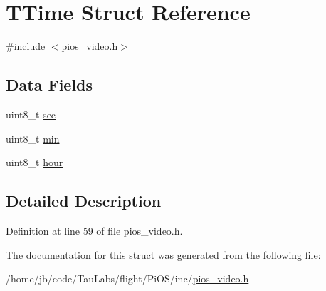 \hypertarget{struct_t_time}{\section{\-T\-Time \-Struct \-Reference}
\label{struct_t_time}
}


{\ttfamily \#include $<$pios\-\_\-video.\-h$>$}

\subsection*{\-Data \-Fields}
\begin{DoxyCompactItemize}
\item 
uint8\-\_\-t \hyperlink{group___p_i_o_s___v_i_d_e_o_gaa6288943af354a6cb143f2ad677cfece}{sec}
\item 
uint8\-\_\-t \hyperlink{group___p_i_o_s___v_i_d_e_o_gadb9b0440ee5ef05786949736913ce45c}{min}
\item 
uint8\-\_\-t \hyperlink{group___p_i_o_s___v_i_d_e_o_gae7afd210e593b007611ac237bd32d30d}{hour}
\end{DoxyCompactItemize}


\subsection{\-Detailed \-Description}


\-Definition at line 59 of file pios\-\_\-video.\-h.



\-The documentation for this struct was generated from the following file\-:\begin{DoxyCompactItemize}
\item 
/home/jb/code/\-Tau\-Labs/flight/\-Pi\-O\-S/inc/\hyperlink{pios__video_8h}{pios\-\_\-video.\-h}\end{DoxyCompactItemize}
